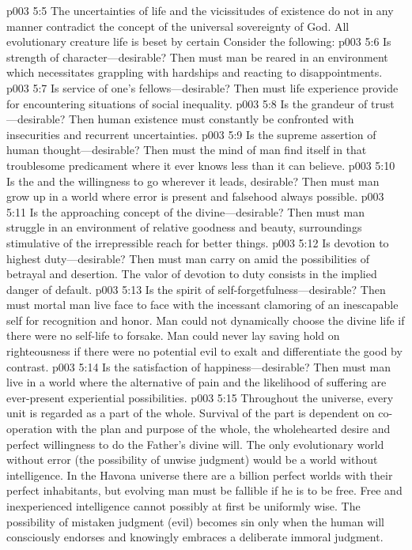 \pc \vs p003 5:5 The uncertainties of life and the vicissitudes of existence do not in any manner contradict the concept of the universal sovereignty of God. All evolutionary creature life is beset by certain  Consider the following:
\pc \vs p003 5:6 \bibnobreakspace Is strength of character---desirable? Then must man be reared in an environment which necessitates grappling with hardships and reacting to disappointments.
\vs p003 5:7 \bibnobreakspace Is service of one’s fellows---desirable? Then must life experience provide for encountering situations of social inequality.
\vs p003 5:8 \bibnobreakspace Is the grandeur of trust---desirable? Then human existence must constantly be confronted with insecurities and recurrent uncertainties.
\vs p003 5:9 \bibnobreakspace Is the supreme assertion of human thought---desirable? Then must the mind of man find itself in that troublesome predicament where it ever knows less than it can believe.
\vs p003 5:10 \bibnobreakspace Is the  and the willingness to go wherever it leads, desirable? Then must man grow up in a world where error is present and falsehood always possible.
\vs p003 5:11 \bibnobreakspace Is the approaching concept of the divine---desirable? Then must man struggle in an environment of relative goodness and beauty, surroundings stimulative of the irrepressible reach for better things.
\vs p003 5:12 \bibnobreakspace Is devotion to highest duty---desirable? Then must man carry on amid the possibilities of betrayal and desertion. The valor of devotion to duty consists in the implied danger of default.
\vs p003 5:13 \bibnobreakspace Is the spirit of self\hyp{}forgetfulness---desirable? Then must mortal man live face to face with the incessant clamoring of an inescapable self for recognition and honor. Man could not dynamically choose the divine life if there were no self\hyp{}life to forsake. Man could never lay saving hold on righteousness if there were no potential evil to exalt and differentiate the good by contrast.
\vs p003 5:14 \bibnobreakspace Is the satisfaction of hap\-pi\-ness---desirable? Then must man live in a world where the alternative of pain and the likelihood of suffering are ever\hyp{}present experiential possibilities.
\pc \vs p003 5:15 Throughout the universe, every unit is regarded as a part of the whole. Survival of the part is dependent on co\hyp{}operation with the plan and purpose of the whole, the wholehearted desire and perfect willingness to do the Father’s divine will. The only evolutionary world without error (the possibility of unwise judgment) would be a world without  intelligence. In the Havona universe there are a billion perfect worlds with their perfect inhabitants, but evolving man must be fallible if he is to be free. Free and inexperienced intelligence cannot possibly at first be uniformly wise. The possibility of mistaken judgment (evil) becomes sin only when the human will consciously endorses and knowingly embraces a deliberate immoral judgment.
